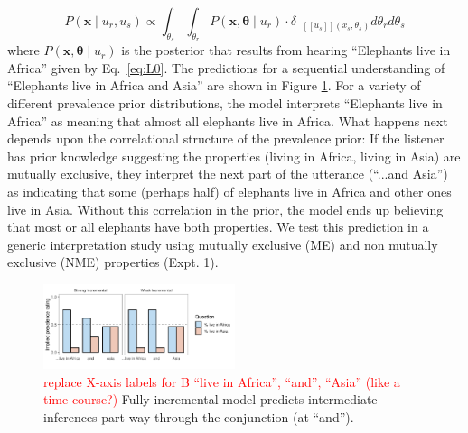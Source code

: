 \documentclass[10pt,letterpaper]{article}
\newcommand{\denote}[1]{\mbox{ $[\![ #1 ]\!]$}}
\newcommand{\red}[1]{{\textcolor{Red}{#1}}}
\begin{document}
\begin{equation}
P(\textbf{x} \mid u_{r}, u_{s}) \propto  \int_{\theta_s} \int_{\theta_r}P(\textbf{x}, \boldsymbol{\theta} \mid u_{r})  \cdot \delta_{\denote{u_{s}}(x_{s}, \theta_{s})} d\theta_r d\theta_s%
\label{eq:L0a}
\end{equation}
\noindent where $P(\textbf{x}, \boldsymbol{\theta} \mid u_{r})$  is the posterior that results from hearing ``Elephants live in Africa'' given by Eq.~\ref{eq:L0}.
The predictions for a sequential understanding of ``Elephants live in Africa and Asia'' are shown in Figure \ref{fig:model}.
For a variety of different prevalence prior distributions, the model interprets ``Elephants live in Africa'' as meaning that almost all elephants live in Africa.
What happens next depends upon the correlational structure of the prevalence prior: If the listener has prior knowledge suggesting the properties (living in Africa, living in Asia) are mutually exclusive, they interpret the next part of the utterance (``...and Asia'') as indicating that some (perhaps half) of elephants live in Africa and other ones live in Asia. 
Without this correlation in the prior, the model ends up believing that most or all elephants have both properties. 
We test this prediction in a generic interpretation study using mutually exclusive (ME) and non mutually exclusive (NME) properties (Expt. 1). 

\begin{figure}[h]
  \centering
    \includegraphics[width=0.5\textwidth]{incremental}
  \caption{\red{replace X-axis labels for B ``live in Africa'', ``and'', ``Asia'' (like a time-course?)} Fully incremental model predicts intermediate inferences part-way through the conjunction (at ``and'').
  }
  \label{fig:model}
\end{figure}
\end{document}
